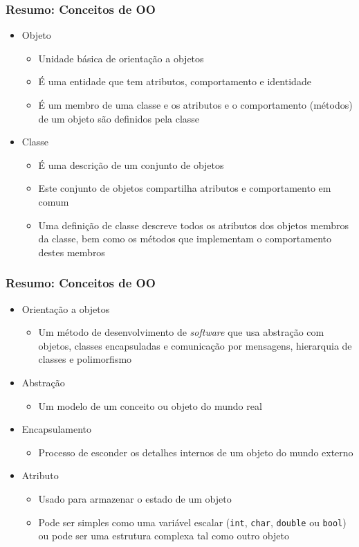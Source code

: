 \documentclass[aspectratio=169]{beamer}
\begin{document}
\begin{frame}\frametitle{Resumo: Conceitos de OO}
\begin{itemize}
	\item Objeto
	\begin{itemize}
		\item Unidade básica de orientação a objetos
		\item É uma entidade que tem atributos, comportamento e identidade
		\item É um membro de uma classe e os atributos e o comportamento (métodos) de um objeto são definidos pela classe
	\end{itemize}
	\item Classe
	\begin{itemize}
		\item É uma descrição de um conjunto de objetos
		\item Este conjunto de objetos compartilha atributos e comportamento em comum
		\item Uma definição de classe descreve todos os atributos dos objetos membros da classe, bem como os métodos que implementam o comportamento destes membros
	\end{itemize}
\end{itemize}
\end{frame}

\begin{frame}\frametitle{Resumo: Conceitos de OO}
\begin{itemize}
	\item Orientação a objetos
	\begin{itemize}
		\item Um método de desenvolvimento de \emph{software} que usa abstração com objetos, classes encapsuladas e comunicação por mensagens, hierarquia de classes e polimorfismo
	\end{itemize}
	\item Abstração
	\begin{itemize}
		\item Um modelo de um conceito ou objeto do mundo real
	\end{itemize}
	\item Encapsulamento
	\begin{itemize}
		\item Processo de esconder os detalhes internos de um objeto do mundo externo
	\end{itemize}
	\item Atributo
	\begin{itemize}
		\item Usado para armazenar o estado de um objeto
		\item Pode ser simples como uma variável escalar (\texttt{int}, \texttt{char}, \texttt{double} ou \texttt{bool}) ou pode ser uma estrutura complexa tal como outro objeto
	\end{itemize}
\end{itemize}
\end{frame}
\end{document}
